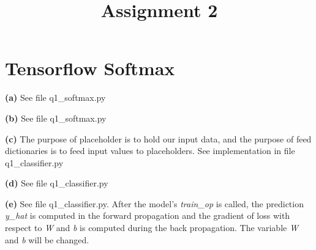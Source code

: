 \documentclass[10pt, a4paper]{ctexart}
\begin{document}
\title{Assignment 2}
\date{}
\author{}
\maketitle

\section{Tensorflow Softmax}
{\bf{(a)}} See file q1\_softmax.py\par
{\bf{(b)}} See file q1\_softmax.py\par
{\bf{(c)}} The purpose of placeholder is to hold our input data, and the purpose of feed dictionaries is to feed input values to placeholders. See implementation in file q1\_classifier.py\par
{\bf{(d)}} See file q1\_classifier.py\par
{\bf({e})} See file q1\_classifier.py. After the model's {\emph{train\_op}} is called, the prediction {\emph{y\_hat}} is computed in the forward propagation and the gradient of loss with respect to {\emph{W}} and {\emph{b}} is computed during the back propagation. The variable {\emph{W}} and {\emph{b}} will be changed.\par
\end{document}
